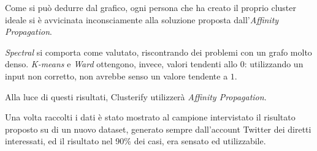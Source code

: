 Come si può dedurre dal grafico, ogni persona che ha creato il proprio cluster ideale si è avvicinata inconsciamente alla soluzione proposta dall'\emph{Affinity Propagation}.

\emph{Spectral} si comporta come valutato, riscontrando dei problemi con un grafo molto denso. \emph{K-means} e \emph{Ward} ottengono, invece, valori tendenti allo $0$: utilizzando un input non corretto, non avrebbe senso un valore tendente a $1$.

Alla luce di questi risultati, Clusterify utilizzerà  \emph{Affinity Propagation}.

Una volta raccolti i dati è stato mostrato al campione intervistato il risultato proposto su di un nuovo dataset, generato sempre dall'account Twitter dei diretti interessati, ed il risultato nel 90\% dei casi, era sensato ed utilizzabile.

